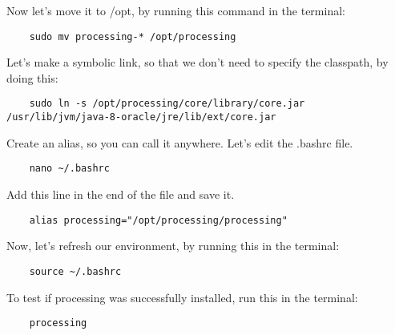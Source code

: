 \documentclass{article}
\begin{document}
Now let's move it to /opt, by running this command in the terminal:

\begin{lstlisting}
	sudo mv processing-* /opt/processing
\end{lstlisting}

Let's make a symbolic link, so that we don't need to specify the classpath, by doing this:

\begin{lstlisting}
	sudo ln -s /opt/processing/core/library/core.jar /usr/lib/jvm/java-8-oracle/jre/lib/ext/core.jar
\end{lstlisting}

Create an alias, so you can call it anywhere. Let's edit the .bashrc file.

\begin{lstlisting}
	nano ~/.bashrc
\end{lstlisting}

\clearpage

Add this line in the end of the file and save it.

\begin{lstlisting}
	alias processing="/opt/processing/processing"
\end{lstlisting}

Now, let's refresh our environment, by running this in the terminal:

\begin{lstlisting}
	source ~/.bashrc
\end{lstlisting}

To test if processing was successfully installed, run this in the terminal:

\begin{lstlisting}
	processing
\end{lstlisting}
\end{document}
